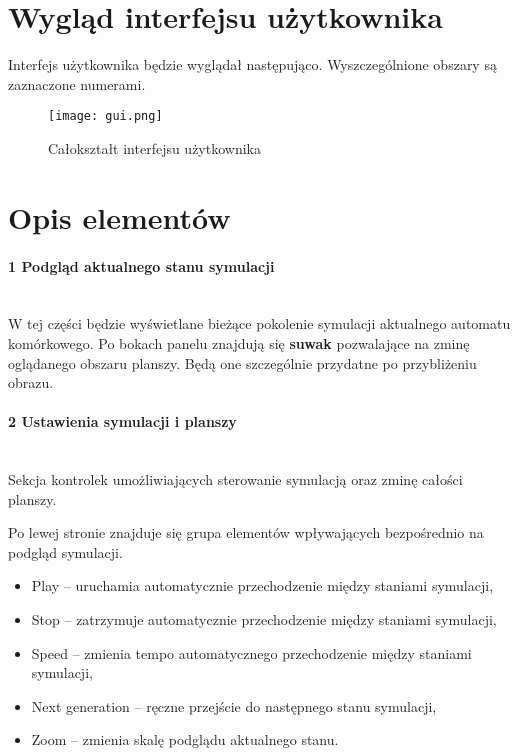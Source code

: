 \documentclass{report}
\begin{document}
\section{Wygląd interfejsu użytkownika} \label{sec:wyglad-gui}
Interfejs użytkownika będzie wyglądał następująco. Wyszczególnione obszary są zaznaczone numerami.
\begin{figure}[H]
    \centering
    \texttt{[image: gui.png]} %
    \caption{Całokształt interfejsu użytkownika}
\end{figure}

\section{Opis elementów}
\paragraph{1 Podgląd aktualnego stanu symulacji} \mbox{} \\
W tej części będzie wyświetlane bieżące pokolenie symulacji aktualnego automatu komórkowego. Po bokach panelu znajdują się \textbf{suwak} pozwalające na zminę oglądanego obszaru planszy. Będą one szczególnie przydatne po przybliżeniu obrazu.

\paragraph{2 Ustawienia symulacji i planszy} \mbox{} \\
Sekcja kontrolek umożliwiających sterowanie symulacją oraz zminę całości planszy.

Po lewej stronie znajduje się grupa elementów wpływających bezpośrednio na podgląd symulacji.
\begin{itemize}
    \item Play -- uruchamia automatycznie przechodzenie między staniami symulacji,
    \item Stop -- zatrzymuje automatycznie przechodzenie między staniami symulacji,
    \item Speed -- zmienia tempo automatycznego przechodzenie między staniami symulacji,
    \item Next generation -- ręczne przejście do następnego stanu symulacji,
    \item Zoom -- zmienia skalę podglądu aktualnego stanu.
\end{itemize}
\end{document}
